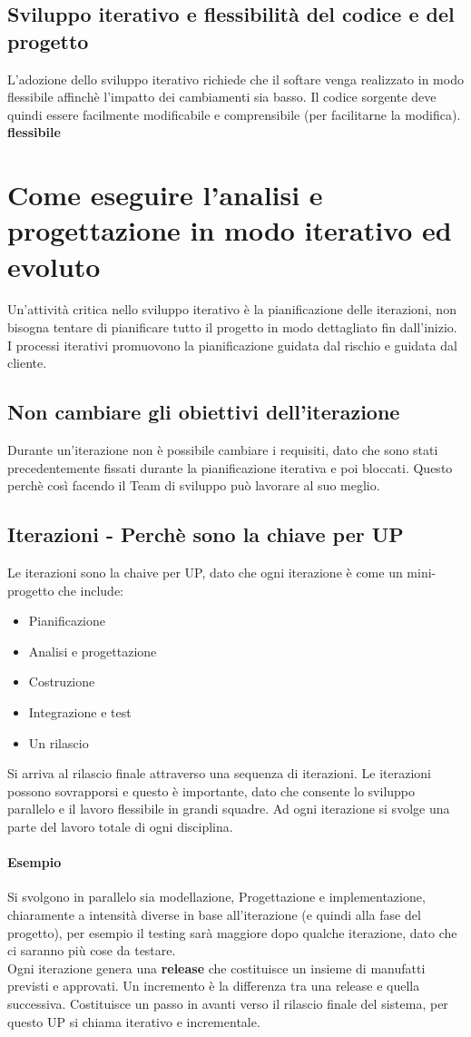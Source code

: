 \subsection{Sviluppo iterativo e flessibilità del codice e del progetto}
L'adozione dello sviluppo iterativo richiede che il softare venga realizzato in modo flessibile
affinchè l'impatto dei cambiamenti sia basso. Il codice sorgente deve quindi essere facilmente
modificabile e comprensibile (per facilitarne la modifica).
\textbf{flessibile}
\section{Come eseguire l'analisi e progettazione in modo iterativo
ed evoluto}
Un'attività critica nello sviluppo iterativo è la pianificazione delle iterazioni,
non bisogna tentare di pianificare tutto il progetto in modo dettagliato fin dall'inizio.
I processi iterativi promuovono la pianificazione guidata dal rischio e guidata dal cliente.
\subsection{Non cambiare gli obiettivi dell'iterazione}
Durante un'iterazione non è possibile cambiare i requisiti, dato che sono stati
precedentemente fissati durante la pianificazione iterativa e poi bloccati.
Questo perchè così facendo il Team di sviluppo può lavorare al suo meglio.
\subsection{Iterazioni - Perchè sono la chiave per UP}
Le iterazioni sono la chaive per UP, dato che ogni iterazione è come un mini-progetto 
che include:
\begin{itemize}
    \item Pianificazione
    \item Analisi e progettazione
    \item Costruzione
    \item Integrazione e test
    \item Un rilascio
\end{itemize}
Si arriva al rilascio finale attraverso una sequenza di iterazioni.
Le iterazioni possono sovrapporsi e questo è importante, dato che consente lo
sviluppo parallelo e il lavoro flessibile in grandi squadre.
Ad ogni iterazione si svolge una parte del lavoro totale di ogni disciplina.
\paragraph*{Esempio} Si svolgono in parallelo sia modellazione, Progettazione
 e implementazione, chiaramente a intensità diverse in base all'iterazione (e quindi
 alla fase del progetto), per esempio il testing sarà maggiore dopo qualche iterazione, 
 dato che ci saranno più cose da testare.
 \\ Ogni iterazione genera una \textbf{release} che costituisce un insieme di manufatti
 previsti e approvati. Un incremento è la differenza tra una release e quella successiva.
 Costituisce un passo in avanti verso il rilascio finale del sistema, per questo UP si chiama
 iterativo e incrementale.
